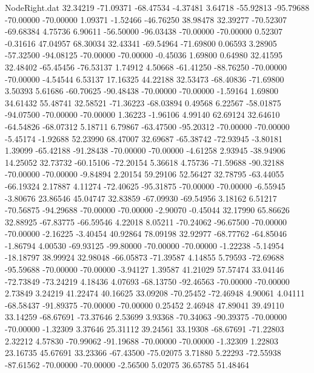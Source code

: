\begin{filecontents}{NodeRight.dat}
  32.34219  -71.09371  -68.47534    -4.37481    3.64718  -55.92813  -95.79688  -70.00000  -70.00000    1.09371   -1.52466  -46.76250   38.98478
  32.39277  -70.52307  -69.68384     4.75736    6.90611  -56.50000  -96.03438  -70.00000  -70.00000    0.52307   -0.31616   47.04957   68.30034
  32.43341  -69.54964  -71.69800     0.06593    3.28905  -57.32500  -94.08125  -70.00000  -70.00000   -0.45036    1.69800    0.64980   32.41595
  32.48402  -65.45456  -76.53137     1.74912    4.50668  -61.41250  -88.76250  -70.00000  -70.00000   -4.54544    6.53137   17.16325   44.22188
  32.53473  -68.40836  -71.69800     3.50393    5.61686  -60.70625  -90.48438  -70.00000  -70.00000   -1.59164    1.69800   34.61432   55.48741
  32.58521  -71.36223  -68.03894     0.49568    6.22567  -58.01875  -94.07500  -70.00000  -70.00000    1.36223   -1.96106    4.99140   62.69124
  32.64610  -64.54826  -68.07312     5.18711    6.79867  -63.47500  -95.20312  -70.00000  -70.00000   -5.45174   -1.92688   52.23990   68.47007
  32.69687  -65.38742  -72.93945    -3.80181    1.39099  -65.42188  -91.28438  -70.00000  -70.00000   -4.61258    2.93945  -38.94906   14.25052
  32.73732  -60.15106  -72.20154     5.36618    4.75736  -71.59688  -90.32188  -70.00000  -70.00000   -9.84894    2.20154   59.29106   52.56427
  32.78795  -63.44055  -66.19324     2.17887    4.11274  -72.40625  -95.31875  -70.00000  -70.00000   -6.55945   -3.80676   23.86546   45.04747
  32.83859  -67.09930  -69.54956     3.18162    6.51217  -70.56875  -94.29688  -70.00000  -70.00000   -2.90070   -0.45044   32.17990   65.86626
  32.88925  -67.83775  -66.59546     4.22018    8.05211  -70.24062  -96.67500  -70.00000  -70.00000   -2.16225   -3.40454   40.92864   78.09198
  32.92977  -68.77762  -64.85046    -1.86794    4.00530  -69.93125  -99.80000  -70.00000  -70.00000   -1.22238   -5.14954  -18.18797   38.99924
  32.98048  -66.05873  -71.39587     4.14855    5.79593  -72.69688  -95.59688  -70.00000  -70.00000   -3.94127    1.39587   41.21029   57.57474
  33.04146  -72.73849  -73.24219     4.18436    4.07693  -68.13750  -92.46563  -70.00000  -70.00000    2.73849    3.24219   41.22474   40.16625
  33.09208  -70.25452  -72.46948     4.90061    4.04111  -68.58437  -91.89375  -70.00000  -70.00000    0.25452    2.46948   47.89041   39.49110
  33.14259  -68.67691  -73.37646     2.53699    3.93368  -70.34063  -90.39375  -70.00000  -70.00000   -1.32309    3.37646   25.31112   39.24561
  33.19308  -68.67691  -71.22803     2.32212    4.57830  -70.99062  -91.19688  -70.00000  -70.00000   -1.32309    1.22803   23.16735   45.67691
  33.23366  -67.43500  -75.02075     3.71880    5.22293  -72.55938  -87.61562  -70.00000  -70.00000   -2.56500    5.02075   36.65785   51.48464

\end{filecontents}
